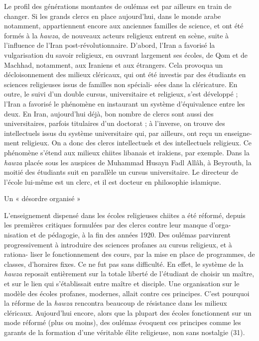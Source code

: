 Le profil des générations montantes de oulémas est par ailleurs en train
de changer. Si les grands clercs en place aujourd'hui, dans le monde
arabe notamment, appartiennent encore aux anciennes familles de science,
et ont été formés à la \emph{hawza}, de nouveaux acteurs religieux
entrent en scène, suite à l'influence de l'Iran post-révolutionnaire.
D'abord, l'Iran a favorisé la vulgarisation du savoir religieux, en
ouvrant largement ses écoles, de Qom et de Machhad, notamment, aux
Iraniens et aux étrangers. Cela provoqua un décloisonnement des milieux
cléricaux, qui ont été investis par des étudiants en sciences
religieuses issus de familles non spéciali- sées dans la cléricature. En
outre, le suivi d'un double cursus, universitaire et religieux, s'est
développé ; l'Iran a favorisé le phénomène en instaurant un système
d'équivalence entre les deux. En Iran, aujourd'hui déjà, bon nombre de
clercs sont aussi des universitaires, parfois titulaires d'un doctorat ;
à l'inverse, on trouve des intellectuels issus du système universitaire
qui, par ailleurs, ont reçu un enseigne- ment religieux. On a donc des
clercs intellectuels et des intellectuels religieux. Ce phénomène
s'étend aux milieux chiites libanais et irakiens, par exemple. Dans la
\emph{hawza} placée sous les auspices de Muhammad Husayn Fadl Allâh, à
Beyrouth, la moitié des étudiants suit en parallèle un cursus
universitaire. Le directeur de l'école lui-même est un clerc, et il est
docteur en philosophie islamique.

Un « désordre organisé »

L'enseignement dispensé dans les écoles religieuses chiites a été
réformé, depuis les premières critiques formulées par des clercs contre
leur manque d'orga- nisation et de pédagogie, à la fin des années 1920.
Des oulémas parvinrent progressivement à introduire des sciences
profanes au cursus religieux, et à rationa- liser le fonctionnement des
cours, par la mise en place de programmes, de classes, d'horaires fixes.
Ce ne fut pas sans difficulté. En effet, le système de la \emph{hawza}
reposait entièrement sur la totale liberté de l'étudiant de choisir un
maître, et sur le lien qui s'établissait entre maître et disciple. Une
organisation sur le modèle des écoles profanes, modernes, allait contre
ces principes. C'est pourquoi la réforme de la \emph{hawza} rencontra
beaucoup de résistance dans les milieux cléricaux. Aujourd'hui encore,
alors que la plupart des écoles fonctionnent sur un mode réformé (plus
ou moins), des oulémas évoquent ces principes comme les garants de la
formation d'une véritable élite religieuse, non sans nostalgie (31).

